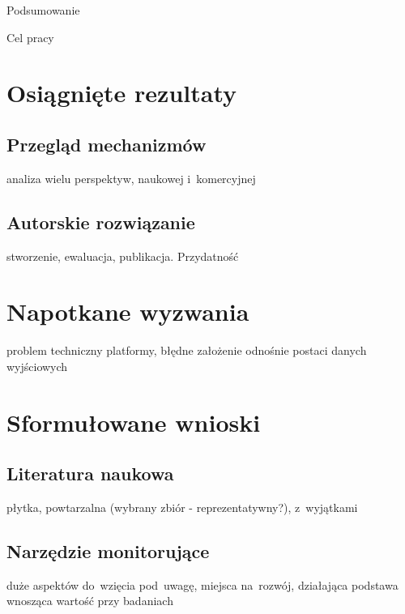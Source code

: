  \begin{chapter}{Podsumowanie}
	\newcommand{\chapterPath}{chapters/Summary}

	Cel pracy
	
	\section{Osiągnięte rezultaty}
	
	\subsection{Przegląd mechanizmów}
	analiza wielu perspektyw, naukowej i~komercyjnej
	
	\subsection{Autorskie rozwiązanie}
	stworzenie, ewaluacja, publikacja. Przydatność
	
	\section{Napotkane wyzwania}
	problem techniczny platformy, błędne założenie odnośnie postaci danych wyjściowych
	
	\section{Sformułowane wnioski}
	
	\subsection{Literatura naukowa}
	płytka, powtarzalna (wybrany zbiór - reprezentatywny?), z~wyjątkami
	
	\subsection{Narzędzie monitorujące}
	duże aspektów do~wzięcia pod~uwagę, miejsca na~rozwój, działająca podstawa wnosząca wartość przy badaniach
	
\end{chapter}
